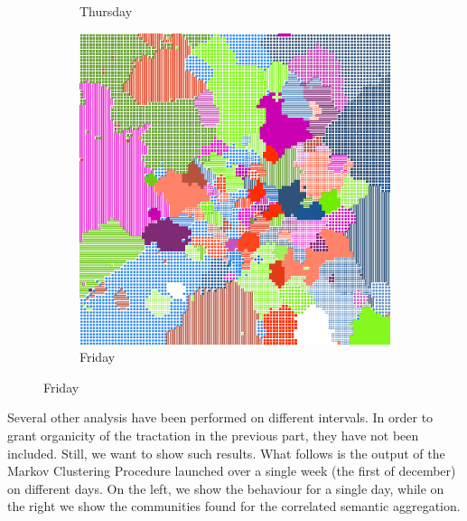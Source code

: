 \documentclass[12pt,a4paper]{article}
\begin{document}
\begin{figure}[H]
\begin{subfigure}[b]{0.30\textwidth}
\caption{Thursday}
\end{subfigure}
\begin{subfigure}[b]{0.30\textwidth}
\includegraphics[width=\textwidth]{weekDef/5Fri.png}
\caption{Friday}
\end{subfigure}
\end{figure}

Several other analysis have been performed on different intervals. In order to grant organicity of the tractation in the previous part, they have not been included.
Still, we want to show such results.
What follows is the output of the Markov Clustering Procedure launched over a single week (the first of december) on different days. On the left, we show the behaviour for a single day, while on the right we show the communities found for the correlated semantic aggregation.
\end{document}
